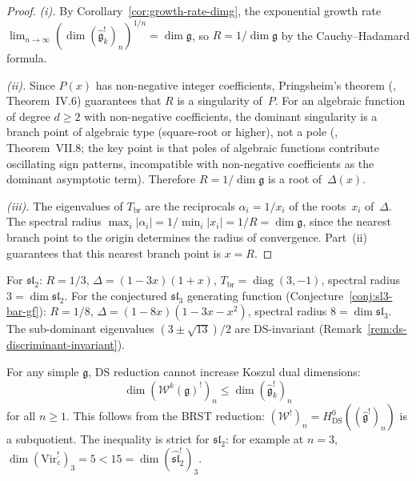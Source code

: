 \begin{proof}
\emph{(i).}
By Corollary~\ref{cor:growth-rate-dimg}, the exponential growth rate
$\lim_{n \to \infty} (\dim(\widehat{\mathfrak{g}}_k^!)_n)^{1/n}
= \dim\mathfrak{g}$, so $R = 1/\dim\mathfrak{g}$ by the
Cauchy--Hadamard formula.

\emph{(ii).}
Since $P(x)$ has non-negative integer coefficients, Pringsheim's
theorem (\cite{FlajoletSedgewick}, Theorem~IV.6) guarantees that
$R$ is a singularity of~$P$.  For an algebraic function of
degree $d \geq 2$ with non-negative coefficients, the dominant
singularity is a branch point of algebraic type (square-root or
higher), not a pole (\cite{FlajoletSedgewick}, Theorem~VII.8;
the key point is that poles of algebraic functions contribute
oscillating sign patterns, incompatible with non-negative
coefficients as the dominant asymptotic term).
Therefore $R = 1/\dim\mathfrak{g}$ is a root of~$\Delta(x)$.

\emph{(iii).}
The eigenvalues of $T_{\mathrm{br}}$ are the reciprocals
$\alpha_i = 1/x_i$ of the roots~$x_i$ of~$\Delta$.
The spectral radius $\max_i |\alpha_i| = 1/\min_i |x_i| = 1/R
= \dim\mathfrak{g}$, since the nearest branch point to the origin
determines the radius of convergence.  Part~(ii) guarantees that
this nearest branch point is $x = R$.
\end{proof}

\begin{remark}\label{rem:dominant-branch-verified}
For $\mathfrak{sl}_2$: $R = 1/3$, $\Delta = (1 - 3x)(1+x)$,
$T_{\mathrm{br}} = \operatorname{diag}(3, -1)$, spectral radius $3
= \dim\mathfrak{sl}_2$.
For the conjectured $\mathfrak{sl}_3$ generating function
(Conjecture~\ref{conj:sl3-bar-gf}): $R = 1/8$,
$\Delta = (1 - 8x)(1 - 3x - x^2)$, spectral radius $8
= \dim\mathfrak{sl}_3$.  The sub-dominant eigenvalues
$(3 \pm \sqrt{13})/2$ are DS-invariant
(Remark~\ref{rem:ds-discriminant-invariant}).
\end{remark}

\begin{remark}\label{rem:ds-dimension-inequality}
For any simple $\mathfrak{g}$, DS reduction cannot increase Koszul dual dimensions:
\[
\dim (\mathcal{W}^k(\mathfrak{g})^!)_n \leq \dim (\widehat{\mathfrak{g}}_k^!)_n
\]
for all $n \geq 1$.  This follows from the BRST reduction: $(\mathcal{W}^!)_n = H^0_{\mathrm{DS}}((\widehat{\mathfrak{g}}^!)_n)$ is a subquotient.  The inequality is strict for $\mathfrak{sl}_2$: for example at $n = 3$, $\dim (\mathrm{Vir}_c^!)_3 = 5 < 15 = \dim (\widehat{\mathfrak{sl}}_2^!)_3$.
\end{remark}

